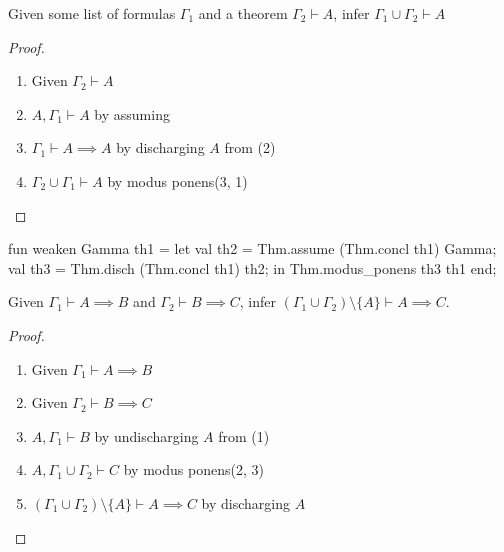 \begin{node}
Given some list of formulas $\Gamma_{1}$ and a theorem
$\Gamma_{2}\vdash A$, infer $\Gamma_{1}\cup\Gamma_{2}\vdash A$
\end{node}

\begin{proof}
\begin{enumerate}
\item Given $\Gamma_{2}\vdash A$
\item $A,\Gamma_{1}\vdash A$ by assuming
\item $\Gamma_{1}\vdash A\implies A$ by discharging $A$ from (2)
\item $\Gamma_{2}\cup\Gamma_{1}\vdash A$ by modus ponens(3, 1)\qedhere
\end{enumerate}
\end{proof}

\nwenddocs{}\endmoddef\nwstartdeflinemarkup{}\nwenddeflinemarkup
fun weaken Gamma th1 =
  let
    val th2 = Thm.assume (Thm.concl th1) Gamma;
    val th3 = Thm.disch (Thm.concl th1) th2;
  in
    Thm.modus_ponens th3 th1
  end;
\eatline
{}\nwendcode{}\nwdocspar
\begin{node}
Given $\Gamma_{1}\vdash A\implies B$ and $\Gamma_{2}\vdash B\implies C$,
infer $(\Gamma_{1}\cup\Gamma_{2})\setminus\{A\}\vdash A\implies C$.
\end{node}

\begin{proof}
\begin{enumerate}
\item Given $\Gamma_{1}\vdash A\implies B$
\item Given $\Gamma_{2}\vdash B\implies C$
\item $A,\Gamma_{1}\vdash B$ by undischarging $A$ from (1)
\item $A,\Gamma_{1}\cup\Gamma_{2}\vdash C$ by modus ponens(2, 3)
\item $(\Gamma_{1}\cup\Gamma_{2})\setminus\{A\}\vdash A\implies C$ by discharging $A$\qedhere
\end{enumerate}
\end{proof}

